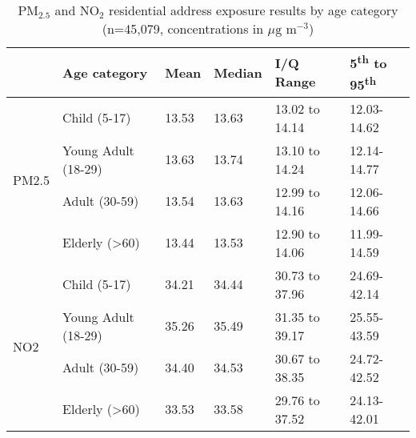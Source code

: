 \begin{table}[H]
\centering
\begin{tabular}{|l|l|l|l|l|l|}
\hline
                       & \bfseries{Age category}  & \bfseries{Mean}  & \bfseries{Median} & \bfseries{I/Q Range} & \bfseries{5\textsuperscript{th} to 95\textsuperscript{th}} \\ \hline
\multirow{4}{*}{PM2.5} & Child (5-17)             & 13.53 & 13.63 & 13.02 to 14.14    & 12.03-14.62 \\ \cline{2-5} 
                       & Young Adult (18-29)      & 13.63 & 13.74 & 13.10 to 14.24    & 12.14-14.77 \\ \cline{2-5} 
                       & Adult (30-59)            & 13.54 & 13.63 & 12.99 to 14.16    & 12.06-14.66 \\ \cline{2-5} 
                       & Elderly (\textgreater60) & 13.44 & 13.53 & 12.90 to 14.06    & 11.99-14.59 \\ \hline
\multirow{4}{*}{NO2}   & Child (5-17)             & 34.21 & 34.44 & 30.73 to 37.96    & 24.69-42.14 \\ \cline{2-5} 
                       & Young Adult (18-29)      & 35.26 & 35.49 & 31.35 to 39.17    & 25.55-43.59 \\ \cline{2-5} 
                       & Adult (30-59)            & 34.40 & 34.53 & 30.67 to 38.35    & 24.72-42.52 \\ \cline{2-5} 
                       & Elderly (\textgreater60) & 33.53 & 33.58 & 29.76 to 37.52    & 24.13-42.01 \\ \hline
\end{tabular}
\caption{PM$_{2.5}$ and NO$_{2}$ residential address exposure results by age category (n=45,079, concentrations in $\mu \text{g m}^{-3}$)}
\label{tab:address_comparing_age_categories}
\end{table}

